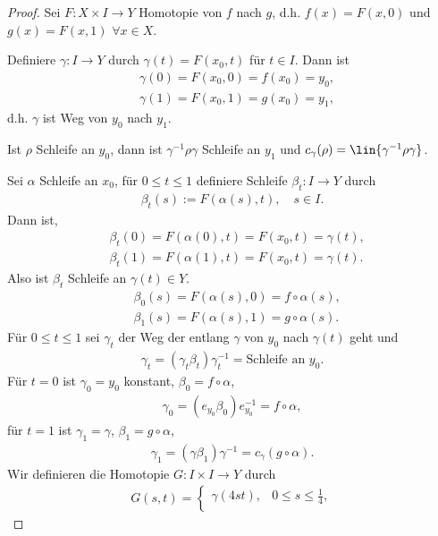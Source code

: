 \begin{proof}
Sei $F: X\times I \to Y$ Homotopie von $f$ nach $g$, d.h. $f(x) = F(x,0)$ und
$g(x) = F(x,1)$ $\forall x\in X$.

Definiere $\gamma: I\to Y$ durch $\gamma(t) = F(x_0,t)$ für $t\in I$. Dann ist
\begin{align*}
&\gamma(0) = F(x_0,0) = f(x_0) = y_0,\\
&\gamma(1) = F(x_0,1) = g(x_0) = y_1, 
\end{align*}
d.h. $\gamma$ ist Weg von $y_0$ nach $y_1$.

Ist $\rho$ Schleife an $y_0$, dann ist $\gamma^{-1}\rho\gamma$ Schleife an
$y_1$ und $c_\gamma(\rho) = \lin{\gamma^{-1}\rho\gamma}$.

Sei $\alpha$ Schleife an $x_0$, für $0\le t\le 1$ definiere Schleife $\beta_t:
I\to Y$ durch
\begin{align*}
\beta_t(s) := F(\alpha(s),t),\quad s\in I.
\end{align*}
Dann ist,
\begin{align*}
&\beta_t(0) = F(\alpha(0),t) = F(x_0,t) = \gamma(t),\\
&\beta_t(1) = F(\alpha(1),t) = F(x_0,t) = \gamma(t).
\end{align*}
Also ist $\beta_t$ Schleife an $\gamma(t)\in Y$.
\begin{align*}
&\beta_0(s) = F(\alpha(s),0) = f\circ\alpha(s),\\
&\beta_1(s) = F(\alpha(s),1) = g\circ\alpha(s).
\end{align*}
Für $0\le t\le 1$ sei $\gamma_t$ der Weg der entlang $\gamma$ von $y_0$ nach
$\gamma(t)$ geht und
\begin{align*}
\gamma_t = (\gamma_t\beta_t)\gamma_t^{-1} = \text{Schleife an } y_0.
\end{align*}
Für $t=0$ ist $\gamma_0 = y_0$ konstant, $\beta_0 = f\circ\alpha$,
\begin{align*}
\gamma_0 = (e_{y_0}\beta_0)e_{y_0}^{-1} = f\circ\alpha,
\end{align*}
für $t=1$ ist $\gamma_1 = \gamma$, $\beta_1 = g\circ\alpha$,
\begin{align*}
\gamma_1 = (\gamma\beta_1)\gamma^{-1} = c_\gamma (g\circ\alpha).
\end{align*}
Wir definieren die Homotopie $G: I\times I\to Y$ durch
\begin{align*}
G(s,t) =
\begin{cases}
\gamma(4st), & 0\le s\le \frac{1}{4},\\

\end{cases}
\end{align*}
\end{proof}
